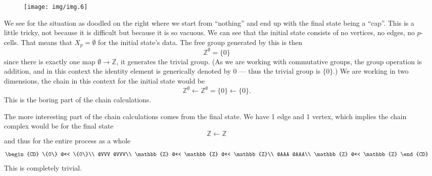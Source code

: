 
\begin{wrapfigure}{r}{1.3in}
\texttt{[image: img/img.6]}
\end{wrapfigure}

We see for the situation as doodled on the right where we start
from ``nothing'' and end up with the final state being a
``cap''. This is a little tricky, not because it is difficult but
because it is so vacuous. We can see that the initial state
consists of no vertices, no edges, no $p$-cells. That means that
$X_{p}=\emptyset$ for the initial state's data. The free group
generated by this is then
\begin{equation}%
\mathbb{Z}^{\emptyset} = \{0\}
\end{equation}
since there is exactly one map $\emptyset\to\mathbb{Z}$, it
generates the trivial group. (As we are working with commutative
groups, the group operation is addition, and in this context the
identity element is generically denoted by 0 --- thus the trivial
group is $\{0\}$.) We are working in two dimensions, the chain in
this context for the initial state would be
\begin{equation}%
\mathbb{Z}^{\emptyset}\leftarrow\mathbb{Z}^{\emptyset}=\{0\}\leftarrow\{0\}.
\end{equation}
This is the boring part of the chain calculations.

The more interesting part of the chain calculations comes from
the final state. We have 1 edge and 1 vertex, which implies the
chain complex would be for the final state
\begin{equation}%
\mathbb{Z}\leftarrow\mathbb{Z}
\end{equation}
and thus for the entire process as a whole
\begin{equation}%
\begin{CD}
\{0\}       @<<< \{0\}\\
@VVV              @VVV\\
\mathbb{Z}  @<<< \mathbb{Z} @<<< \mathbb{Z}\\
@AAA              @AAA\\
\mathbb{Z}  @<<< \mathbb{Z}
\end{CD}
\end{equation}
This is completely trivial. 

